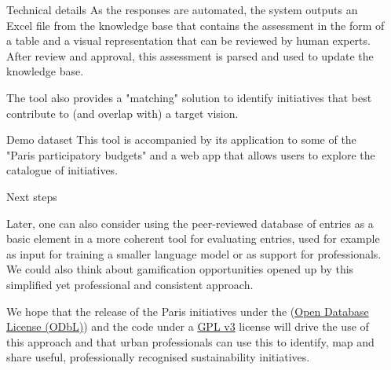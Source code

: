 \documentclass[final]{beamer}
\newlength{\sepmargin}
\newlength{\onecolwid}
\begin{document}
\begin{columns}[t]
\begin{column}{\onecolwid}
\begin{block}{Technical details}
As the responses are automated, the system outputs an Excel file from the knowledge base that contains the assessment in the form of a table and a visual representation that can be reviewed by human experts. After review and approval, this assessment is parsed and used to update the knowledge base.

The tool also provides a "matching" solution to identify initiatives that best contribute to (and overlap with) a target vision.

\end{block}
         \begin{block}{Demo dataset}
This tool is accompanied by its application to some of the "Paris participatory budgets" and a web app that allows users to explore the catalogue of initiatives.


                               \end{block}
          
          
          \begin{block}{Next steps}
          
Later, one can also consider using the peer-reviewed database of entries as a basic element in a more coherent tool for evaluating entries, used for example as input for training a smaller language model or as support for professionals. We could also think about gamification opportunities opened up by this simplified yet professional and consistent approach.

We hope that the release of the Paris initiatives under the (\href{https://opendatacommons.org/licenses/odbl/}{Open Database License (ODbL)}) and the code under a \href{https://www.gnu.org/licenses/gpl-3.0.html}{GPL v3} license will drive the use of this approach and that urban professionals can use this to identify, map and share useful, professionally recognised sustainability initiatives.
          \end{block}
          
      \end{column}
      
      \begin{column}{\sepmargin} \end{column}
      \end{columns} 
       
\end{document}
